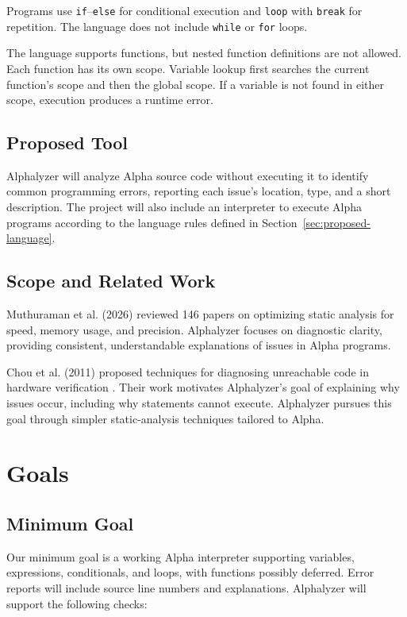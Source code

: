 \documentclass{article}
\begin{document}
Programs use \texttt{if}--\texttt{else} for conditional execution and
\texttt{loop} with \texttt{break} for repetition. The language does not
include \texttt{while} or \texttt{for} loops.

The language supports functions, but nested function definitions are not
allowed. Each function has its own scope. Variable lookup first searches
the current function's scope and then the global scope. If a variable is
not found in either scope, execution produces a runtime error.

\subsection{Proposed Tool}
Alphalyzer will analyze Alpha source code without executing it to identify
common programming errors, reporting each issue's location, type, and a
short description. The project will also include an interpreter to execute
Alpha programs according to the language rules defined in
Section~\ref{sec:proposed-language}.

\subsection{Scope and Related Work}
Muthuraman et al. (2026) reviewed 146 papers on optimizing static analysis
for speed, memory usage, and precision. Alphalyzer focuses on diagnostic
clarity, providing consistent, understandable explanations of issues in
Alpha programs.

Chou et al. (2011) proposed techniques for diagnosing unreachable code in
hardware verification \cite{paper2}. Their work motivates Alphalyzer's goal
of explaining why issues occur, including why statements cannot execute.
Alphalyzer pursues this goal through simpler static-analysis techniques
tailored to Alpha.

\section{Goals}
\label{sec:goals}

\subsection{Minimum Goal}
Our minimum goal is a working Alpha interpreter supporting variables,
expressions, conditionals, and loops, with functions possibly deferred.
Error reports will include source line numbers and explanations.
Alphalyzer will support the following checks:
\end{document}
